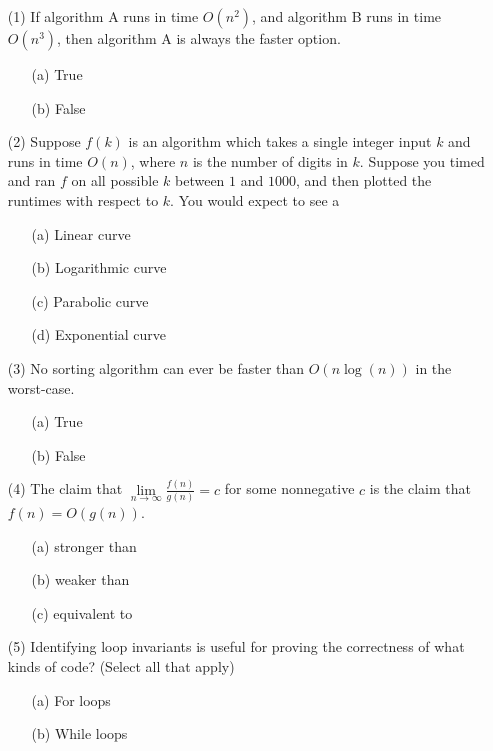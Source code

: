 \documentclass[12pt]{article}
\begin{document}
\newpage
\begin{enumerate}
    \item[(1)] If algorithm A runs in time $O(n^2)$, and algorithm B runs in time $O(n^3)$, then algorithm A is always the faster option.
        \begin{itemize}
            \item[(a)] True
            \item[(b)] False
        \end{itemize}
    \item[(2)] Suppose $f(k)$ is an algorithm which takes a single integer input $k$ and runs in time $O(n)$, where $n$ is the number of digits in $k$. Suppose you timed and ran $f$ on all possible $k$ between $1$ and $1000$, and then plotted the runtimes with respect to $k$. You would expect to see a 
    \begin{itemize}
        \item[(a)] Linear curve
        \item[(b)] Logarithmic curve 
        \item[(c)] Parabolic curve
        \item[(d)] Exponential curve
    \end{itemize}
    \item[(3)] No sorting algorithm can ever be faster than $O(n\log(n))$ in the worst-case.
    \begin{itemize}
        \item[(a)] True
        \item[(b)] False
    \end{itemize}
    \item[(4)] The claim that $\underset{n\to\infty}{\lim}\frac{f(n)}{g(n)} = c$ for some nonnegative $c$ is \underline{\hspace{1.3cm}} the claim that $f(n) = O(g(n))$.
    \begin{itemize}
        \item[(a)] stronger than
        \item[(b)] weaker than
        \item[(c)] equivalent to
    \end{itemize}
    \item[(5)] Identifying loop invariants is useful for proving the correctness of what kinds of code? (Select all that apply)
    \begin{itemize}
            \item[(a)] For loops
            \item[(b)] While loops

\end{itemize}
\end{enumerate}
\end{document}
